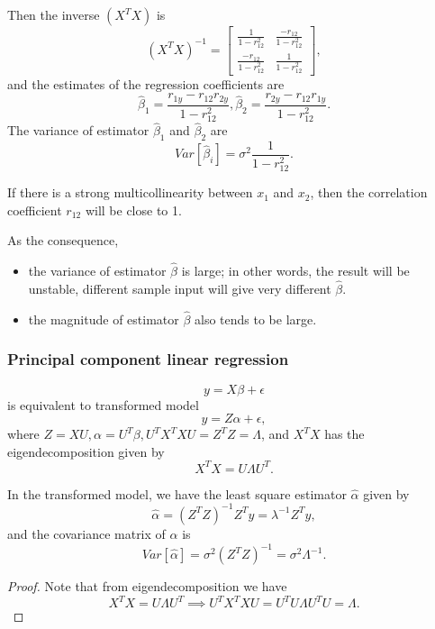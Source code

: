 \begin{refsection}
\begin{example}
Then the inverse $(X^TX)$ is
$$(X^TX)^{-1}=\begin{bmatrix}
\frac{1}{1-r_{12}^2} & \frac{-r_{12}}{1-r_{12}^2}  \\
\frac{-r_{12}}{1-r_{12}^2} & \frac{1}{1-r_{12}^2}  
\end{bmatrix},$$
and the estimates of the regression coefficients are
$$\hat{\beta}_1 = \frac{r_{1y} - r_{12}r_{2y}}{1 - r_{12}^2},\hat{\beta}_2 = \frac{r_{2y} - r_{12}r_{1y}}{1 - r_{12}^2}.$$
The variance of estimator $\hat{\beta}_1$ and $\hat{\beta}_2$ are
$$Var[\hat{\beta}_i] = \sigma^2\frac{1}{1-r_{12}^2}.$$

If there is a strong multicollinearity between $x_1$ and $x_2$, then the correlation coefficient $r_12$ will be close to 1.	

As the consequence, 
\begin{itemize}
	\item the variance of estimator $\hat{\beta}$ is large; in other words, the result will be unstable, different sample input will give very different $\hat{\beta}$.
	\item the magnitude of estimator $\hat{\beta}$ also tends to be large. 
\end{itemize}
\end{example}

\subsubsection{Principal component linear regression}


\begin{lemma}\cite[355]{montgomery2012introduction}
	$$y = X\beta + \epsilon$$
is equivalent to transformed model
$$y = Z\alpha + \epsilon,$$
where $Z = XU, \alpha = U^T\beta, U^TX^TXU = Z^TZ = \Lambda$, and $X^TX$ has the eigendecomposition given by
$$X^TX = U\Lambda U^T.$$	
	
In the transformed model, we have the least square estimator $\hat{\alpha}$ given by
$$\hat{\alpha}=(Z^TZ)^{-1}Z^Ty = \lambda^{-1}Z^Ty,$$
and the covariance matrix of $\hat{\alpha}$ is
$$Var[\hat{\alpha}] = \sigma^2(Z^TZ)^{-1} = \sigma^2 \Lambda^{-1}.$$
	
\end{lemma}
\begin{proof}
Note that from eigendecomposition we have
$$X^TX = U\Lambda U^T \implies U^TX^TXU = U^TU\Lambda U^TU = \Lambda.$$	
\end{proof}


\end{refsection}
